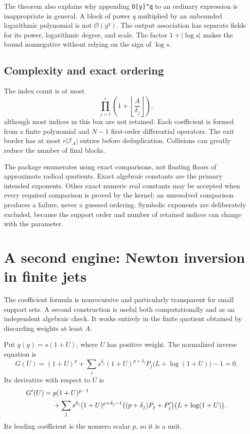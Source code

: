 \documentclass[11pt,a4paper]{article}
\numberwithin{equation}{section}
\theoremstyle{definition}
\newcommand{\OO}{\mathcal O}
\newcommand{\IA}{\mathcal I_A}
\newcommand{\code}[1]{\texttt{#1}}
\begin{document}
The theorem also explains why appending \code{O[y]\^{}q} to an ordinary
expression is inappropriate in general. A block of power $q$ multiplied
by an unbounded logarithmic polynomial is not $\OO(y^q)$. The output
association has separate fields for its power, logarithmic degree, and
scale. The factor $1+|\log s|$ makes the bound nonnegative without relying
on the sign of $\log s$.

\subsection{Complexity and exact ordering}
The index count is at most
\[
 \prod_{j=1}^r\left(1+\left\lfloor\frac A{\delta_j}\right\rfloor\right),
\]
although most indices in this box are not retained. Each coefficient is
formed from a finite polynomial and $N-1$ first-order differential
operators. The exit border has at most $r|\IA|$ entries before
 deduplication. Collisions can greatly reduce the number of final blocks.

The package enumerates using exact comparisons, not floating floors of
approximate radical quotients. Exact algebraic constants are the primary
intended exponents. Other exact numeric real constants may be accepted
when every required comparison is proved by the kernel; an unresolved
comparison produces a failure, never a guessed ordering. Symbolic
exponents are deliberately excluded, because the support order and number
of retained indices can change with the parameter.

\section{A second engine: Newton inversion in finite jets}
\label{sec:newton}

The coefficient formula is nonrecursive and particularly transparent for
small support sets. A second construction is useful both computationally
and as an independent algebraic check. It works entirely in the finite
quotient obtained by discarding weights at least $A$.

Put $g(y)=s(1+U)$, where $U$ has positive weight. The normalized inverse
 equation is
\begin{equation}\label{eq:newton-G}
 G(U)=(1+U)^p+
 \sum_j s^{\delta_j}(1+U)^{p+\delta_j}
 P_j\bigl(L+\log(1+U)\bigr)-1=0.
\end{equation}
Its derivative with respect to $U$ is
\begin{align}
 G'(U)={}&p(1+U)^{p-1}\notag\\
 &+\sum_j s^{\delta_j}(1+U)^{p+\delta_j-1}
 \bigl((p+\delta_j)P_j+P_j'\bigr)
       \bigl(L+\log(1+U)\bigr).
 \label{eq:newton-Gprime}
\end{align}
Its leading coefficient is the nonzero scalar $p$, so it is a unit.
\end{document}
